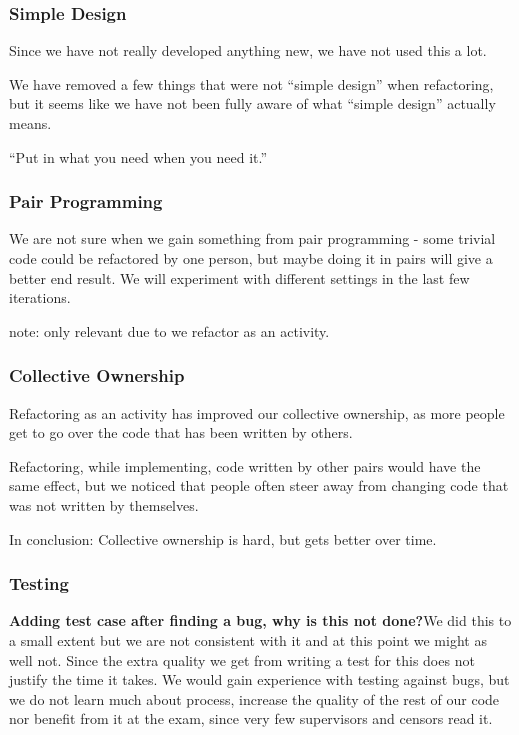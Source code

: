 \subsubsection{Simple Design}
Since we have not really developed anything new, we have not used this a lot.

We have removed a few things that were not “simple design” when refactoring, but it seems like we have not been fully aware of what “simple design” actually means.

“Put in what you need when you need it.”

\subsubsection{Pair Programming}
We are not sure when we gain something from pair programming - some trivial code could be refactored by one person, but maybe doing it in pairs will give a better end result. We will experiment with different settings in the last few iterations.

note: only relevant due to we refactor as an activity.

\subsubsection{Collective Ownership}
Refactoring as an activity has improved our collective ownership, as more people get to go over the code that has been written by others.

Refactoring, while implementing, code written by other pairs would have the same effect, but we noticed that people often steer away from changing code that was not written by themselves.

In conclusion: Collective ownership is hard, but gets better over time.

\subsubsection{Testing}
\textbf{Adding test case after finding a bug, why is this not done?}We did this to a small extent but we are not consistent with it and at this point we might as well not. Since the extra quality we get from writing a test for this does not justify the time it takes. We would gain experience with testing against bugs, but we do not learn much about process, increase the quality of the rest of our code nor benefit from it at the exam, since very few supervisors and censors read it.

